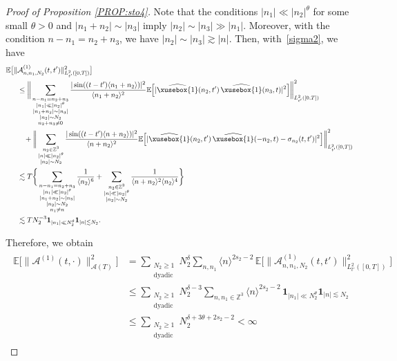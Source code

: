 \documentclass[%
11pt,  reqno]{amsart}
\def\<#1>{\xusebox{#1}}
\newcommand{\1}{\hspace{0.2mm}\text{I}\hspace{0.2mm}}
\newcommand{\noi}{\noindent}
\newcommand{\Z}{\mathbb{Z}}
\newcommand{\E}{\mathbb{E}}
\newcommand{\dl}{\delta}
\newcommand{\s}{\sigma}
\newcommand{\ft}{\widehat}
\newcommand{\les}{\lesssim}
\newcommand{\ges}{\gtrsim}
\newcommand{\jb}[1]
{\langle #1 \rangle}
\newcommand{\ind}{\mathbf 1}
\newcommand{\A}{\mathcal{A}}
\numberwithin{equation}{section}
\numberwithin{theorem}{section}
\begin{document}
\begin{proof}[Proof of Proposition \ref{PROP:sto4}]
Note that the conditions $|n_1| \ll |n_2|^\theta$ for some small $\theta > 0$
and $|n_1 + n_2|\sim |n_3|$ imply $|n_2| \sim |n_3| \gg |n_1|$.
Moreover, with the condition $n - n_1 =  n_2 + n_3$, 
we have $|n_2| \sim |n_3| \ges |n|$.
Then, with~\eqref{sigma2}, we have
\begin{align}
 \E\big[\| & \A_{n, n_1, N_2}^{(1)}  (t, t')\|_{L^2_{t'}([0, T])}^2\big]\notag \\
& \leq\bigg\|\sum_{\substack{n - n_1 =  n_2 + n_3\\ |n_1| \ll |n_2|^\theta \\ |n_1 + n_2|\sim |n_3|\\
|n_2| \sim N_2\\n_2+n_3 \ne 0}}
 \frac{|\sin ((t - t') \jb{ n_1 + n_2 })|^2}{\jb{ n_1 + n_2 }^2} 
\E\Big[   | \ft{\<1>}(n_2, t') \, \ft{\<1>}(n_3, t) |^2\Big] \bigg\|_{L^2_{t'}([0, T])}^2\notag \\ 
& \hphantom{X}
+\bigg\|\sum_{\substack{n_2 \in \Z^3 \\ |n| \ll |n_2|^\theta\\|n_2| \sim N_2}}
  \frac{|\sin ((t - t') \jb{ n + n_2 })|^2}{\jb{ n + n_2 }^2} 
\E\Big[| \ft{\<1>}(n_2, t') \, \ft{\<1>}(-n_2, t) - \s_{n_2}(t, t')|^2\Big]  \bigg\|_{L^2_{t'}([0, T])}^2\notag \\
& \les T\bigg\{
\sum_{\substack{n - n_1 =  n_2 + n_3\\ |n_1| \ll |n_2|^\theta \\ |n_1 + n_2|\sim |n_3|\\
|n_2|\sim N_2\\n_1\ne n}}
\frac{1}{\jb{n_2}^6}
+ \sum_{\substack{n_2 \in \Z^3 \\ |n| \ll |n_2|^\theta\\|n_2| \sim N_2}}
\frac{1}{\jb{n+ n_2}^2 \jb{n_2}^4}
\bigg\} \notag \\
& \les TN_2^{-3} \ind_{|n_1|\ll N_2^\theta} \ind_{ |n| \les  N_2}.
\label{A1}
\end{align}


\noi
Therefore, we obtain
\begin{align}
\begin{split}
\E\big[\|\A^{(1)} (t, \cdot)\|_{\A(T)}^2\big] 
& = \sum_{\substack{N_2\geq 1\\ \text{dyadic}}} N_2^\dl \sum_{n,n_1}
\jb{n}^{2s_2-2}   \, \E\big[\|  \A_{n, n_1, N_2}^{(1)}  (t, t')\|_{L^2_{t'}([0, T])}^2\big] \\
& \leq \sum_{\substack{N_2\geq 1\\ \text{dyadic}}} 
N_2^{\dl-3} \sum_{n,n_1 \in \Z^3}
\jb{n}^{2s_2-2} \, \ind_{|n_1|\ll N_2^\theta} \ind_{ |n| \les  N_2} \\
& \leq \sum_{\substack{N_2\geq 1\\ \text{dyadic}}} N_2^{\dl+3\theta+2s_2-2} < \infty
\end{split}
\label{A1bis}
\end{align}



\end{proof}
\end{document}
